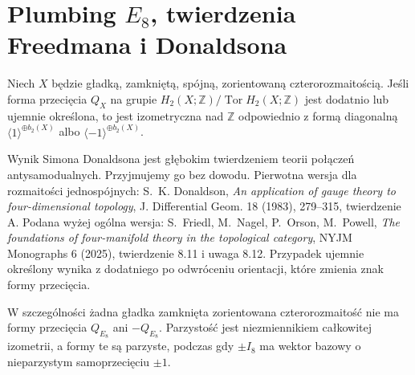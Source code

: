 \begin{center}
\end{center}

\section{Plumbing \texorpdfstring{$E_8$}{E8}, twierdzenia Freedmana i Donaldsona}
\label{sec:tg-plumbing-freedman}

\begin{twierdzenie}
\label{thm:tg-donaldson-definite}
Niech $X$ będzie gładką, zamkniętą, spójną,
zorientowaną czterorozmaitością.
Jeśli forma przecięcia $Q_X$ na grupie
$H_2(X;\mathbb Z)/\operatorname{Tor}H_2(X;\mathbb Z)$
jest dodatnio lub ujemnie określona,
to jest izometryczna nad $\mathbb Z$ odpowiednio
z formą diagonalną
$\langle1\rangle^{\oplus b_2(X)}$ albo
$\langle-1\rangle^{\oplus b_2(X)}$.
\end{twierdzenie}

Wynik Simona Donaldsona jest głębokim twierdzeniem
teorii połączeń antysamodualnych. Przyjmujemy go bez dowodu.
Pierwotna wersja dla rozmaitości jednospójnych:
S.~K. Donaldson, \emph{An application of gauge theory
to four-dimensional topology}, J. Differential Geom.
18 (1983), 279--315, twierdzenie A.
Podana wyżej ogólna wersja:
S.~Friedl, M.~Nagel, P.~Orson, M.~Powell,
\emph{The foundations of four-manifold theory
in the topological category}, NYJM Monographs
6 (2025), twierdzenie 8.11 i uwaga 8.12.
Przypadek ujemnie określony wynika z dodatniego
po odwróceniu orientacji, które zmienia znak
formy przecięcia.

W szczególności żadna gładka zamknięta
zorientowana czterorozmaitość nie ma formy
przecięcia $Q_{E_8}$ ani $-Q_{E_8}$.
Parzystość jest niezmiennikiem całkowitej
izometrii, a formy te są parzyste, podczas gdy
$\pm I_8$ ma wektor bazowy o nieparzystym
samoprzecięciu $\pm1$.


